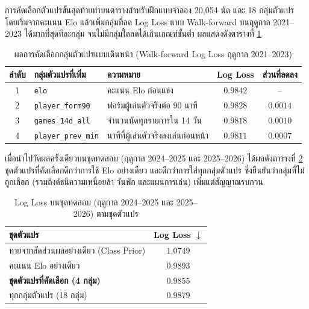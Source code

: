 การคัดเลือกตัวแปรขั้นสุดท้ายทำบนตารางสำหรับฝึกแบบจำลอง 20,054 นัด และ 18 กลุ่มตัวแปร โดยเริ่มจากคะแนน Elo แล้วเพิ่มกลุ่มที่ลด Log Loss แบบ Walk-forward บนฤดูกาล 2021--2023 ได้มากที่สุดทีละกลุ่ม จนไม่มีกลุ่มใดลดได้เกินเกณฑ์ขั้นต่ำ ผลแสดงดังตารางที่ \ref{tab:forward_selection}

\begin{table}[htbp]
\centering
\caption{ผลการคัดเลือกกลุ่มตัวแปรแบบเดินหน้า (Walk-forward Log Loss ฤดูกาล 2021--2023)}
\label{tab:forward_selection}
\small
\begin{tabular}{|c|l|l|c|c|}
\hline
\textbf{ลำดับ} & \textbf{กลุ่มตัวแปรที่เพิ่ม} & \textbf{ความหมาย} & \textbf{Log Loss} & \textbf{ส่วนที่ลดลง} \\
\hline
1 & \texttt{elo} & คะแนน Elo ก่อนแข่ง & $0.9842$ & -- \\
2 & \texttt{player\_form90} & ฟอร์มผู้เล่นตัวจริงต่อ 90 นาที & $0.9828$ & $0.0014$ \\
3 & \texttt{games\_14d\_all} & จำนวนนัดทุกรายการใน 14 วัน & $0.9818$ & $0.0010$ \\
4 & \texttt{player\_prev\_min} & นาทีที่ผู้เล่นตัวจริงลงเล่นก่อนหน้า & $0.9811$ & $0.0007$ \\
\hline
\end{tabular}
\end{table}

เมื่อนำไปวัดผลครั้งเดียวบนชุดทดสอบ (ฤดูกาล 2024--2025 และ 2025--2026) ได้ผลดังตารางที่ \ref{tab:feature_holdout} ชุดตัวแปรที่คัดเลือกดีกว่าการใช้ Elo อย่างเดียว และดีกว่าการใส่ทุกกลุ่มตัวแปร ซึ่งยืนยันว่ากลุ่มที่ไม่ถูกเลือก (รวมถึงดัชนีความเหนื่อยล้า วันพัก และแผนการเล่น) เพิ่มแต่สัญญาณรบกวน

\begin{table}[htbp]
\centering
\caption{Log Loss บนชุดทดสอบ (ฤดูกาล 2024--2025 และ 2025--2026) ตามชุดตัวแปร}
\label{tab:feature_holdout}
\begin{tabular}{|l|c|}
\hline
\textbf{ชุดตัวแปร} & \textbf{Log Loss} $\downarrow$ \\
\hline
ทายจากสัดส่วนผลอย่างเดียว (Class Prior) & $1.0749$ \\
คะแนน Elo อย่างเดียว & $0.9893$ \\
\textbf{ชุดตัวแปรที่คัดเลือก (4 กลุ่ม)} & $\mathbf{0.9855}$ \\
ทุกกลุ่มตัวแปร (18 กลุ่ม) & $0.9879$ \\
\hline
\end{tabular}
\end{table}

